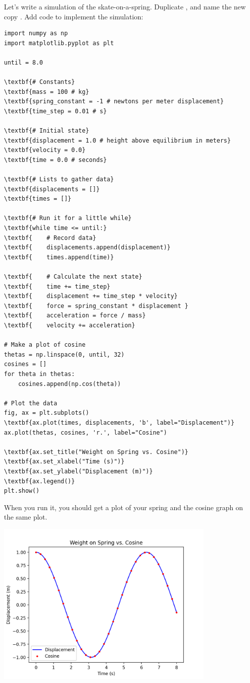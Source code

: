 Let's write a simulation of the skate-on-a-spring. Duplicate , and name the new copy .  Add code to implement the simulation:

\begin{Verbatim}[commandchars=\\\{\}]
import numpy as np
import matplotlib.pyplot as plt

until = 8.0

\textbf{# Constants}
\textbf{mass = 100 # kg}
\textbf{spring_constant = -1 # newtons per meter displacement}
\textbf{time_step = 0.01 # s}

\textbf{# Initial state}
\textbf{displacement = 1.0 # height above equilibrium in meters}
\textbf{velocity = 0.0}
\textbf{time = 0.0 # seconds}

\textbf{# Lists to gather data}
\textbf{displacements = []}
\textbf{times = []}

\textbf{# Run it for a little while}
\textbf{while time <= until:}
\textbf{    # Record data}
\textbf{    displacements.append(displacement)}
\textbf{    times.append(time)}

\textbf{    # Calculate the next state}
\textbf{    time += time_step}
\textbf{    displacement += time_step * velocity}
\textbf{    force = spring_constant * displacement }
\textbf{    acceleration = force / mass}
\textbf{    velocity += acceleration}

# Make a plot of cosine
thetas = np.linspace(0, until, 32)
cosines = []
for theta in thetas:
    cosines.append(np.cos(theta))

# Plot the data
fig, ax = plt.subplots()
\textbf{ax.plot(times, displacements, 'b', label="Displacement")}
ax.plot(thetas, cosines, 'r.', label="Cosine")

\textbf{ax.set_title("Weight on Spring vs. Cosine")}
\textbf{ax.set_xlabel("Time (s)")}
\textbf{ax.set_ylabel("Displacement (m)")}
\textbf{ax.legend()}
plt.show()
\end{Verbatim}
When you run it, you should get a plot of your spring and the cosine graph on the same plot.

\includegraphics[width=0.8\textwidth]{springpy.png}

